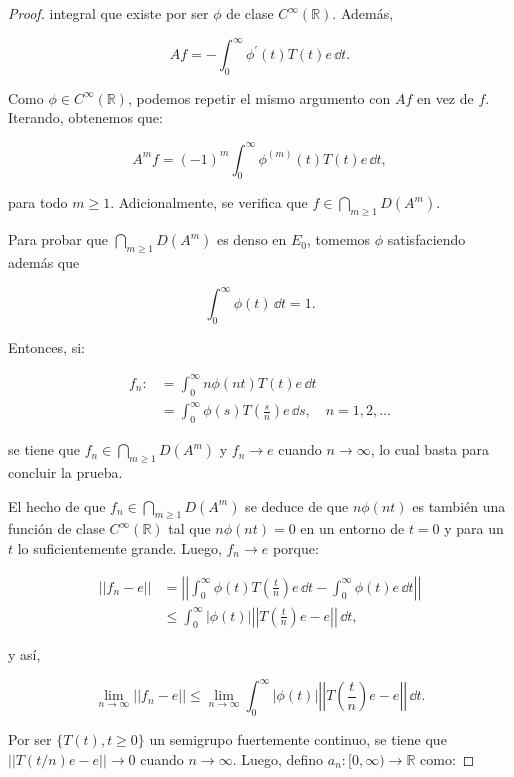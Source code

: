 \begin{proof}
    integral que existe por ser $\phi$ de clase $C^\infty(\mathbb{R})$. Además,

    \[Af = - \int_0^{\infty}\phi^{\prime}(t) T(t) e \, \dd t.\]

    Como $\phi \in C^\infty(\mathbb{R})$, podemos repetir el mismo argumento con $Af$ en vez de $f$. Iterando, obtenemos que:

    \[A^mf = (-1)^m \int_0^{\infty}\phi^{(m)}(t) T(t) e \, \dd t,\]

    para todo $m \geq 1$. Adicionalmente, se verifica que $\displaystyle f \in \bigcap_{m \geq 1}D(A^m)$.

    Para probar que $\displaystyle \bigcap_{m \geq 1}D(A^m)$ es denso en $E_0$, tomemos $\phi$ satisfaciendo además que

    \[\int_0^\infty \phi(t) \, \dd t = 1.\]

    Entonces, si:

    \begin{align*}
        f_n :&= \int_0^\infty n \phi(nt) T(t) e \, \dd t\\
        &= \int_0^\infty \phi(s) T\left(\frac{s}{n}\right) e \, \dd s, \quad n = 1,2,\ldots
    \end{align*}

    se tiene que $\displaystyle f_n \in \bigcap_{m \geq 1}D(A^m)$ y $f_n \rightarrow e$ cuando $n \rightarrow \infty$, lo cual basta para concluir la prueba.

    El hecho de que $\displaystyle f_n \in \bigcap_{m \geq 1} D(A^m)$ se deduce de que $n \phi(nt)$ es también una función de clase $C^\infty(\mathbb{R})$ tal que $n \phi(nt) = 0$ en un entorno de $t = 0$ y para un $t$ lo suficientemente grande. Luego, $f_n \rightarrow e$ porque:

    \begin{align*}
        ||f_n - e|| &= \left | \left |\int_0^\infty \phi(t) T\left(\frac{t}{n} \right)e \, \dd t - \int_0^\infty \phi(t)e \, \dd t \right | \right |\\
        &\leq \int_0^\infty |\phi(t)| \left | \left |T\left(\frac{t}{n} \right)e - e\right | \right | \, \dd t,
    \end{align*}

    y así,

    \[\lim_{n\rightarrow \infty} ||f_n - e|| \leq \lim_{n\rightarrow \infty} \int_0^\infty |\phi(t)| \left | \left |T\left(\frac{t}{n} \right)e - e\right | \right | \, \dd t.\]

    Por ser $\{T(t), t \geq 0\}$ un semigrupo fuertemente continuo, se tiene que $||T(t/n)e - e||\rightarrow 0$ cuando $n \rightarrow \infty$. Luego, defino $a_n : [0,\infty) \rightarrow \mathbb{R}$ como:


\end{proof}
